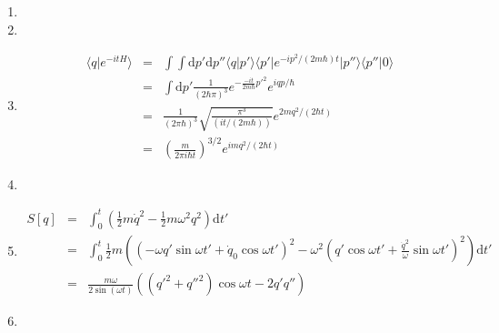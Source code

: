 \documentclass[12pt,a4paper]{article}
\begin{document}
\begin{enumerate}
\item




\item






\item
\begin{eqnarray*}
	\langle q \vert e^{-itH} \rangle &=& \int\int \mathrm dp' \mathrm dp'' \langle q\vert p' \rangle \langle p'  \vert e^{-i p^2/(2m\hbar) t} \vert p''\rangle \langle p'' \vert 0 \rangle \\
	&=& \int \mathrm dp' \frac{1}{(2\hbar \pi)^3} e^{-\frac{-it}{2m\hbar} p'^2} e^{iqp/\hbar} \\
	&=& \frac{1}{(2\pi \hbar)^3} \sqrt{\frac{\pi^3}{(it/(2 m\hbar))}} e^{2mq^2/(2\hbar t)} \\
	&=& \left( \frac{m}{2\pi i\hbar t} \right)^{3/2} e^{imq^2/(2\hbar t)}
\end{eqnarray*}



\item







\item

\begin{eqnarray*}
	S[q] &=& \int_0^t \left( \frac 12 m\dot q^2 - \frac 1 2 m \omega^2  q^2 \right)\mathrm dt' \\
	&=& \int_0^t \frac 1 2 m\left( (-\omega q' \sin\omega t' + \dot q_0 \cos\omega t')^2 -  \omega^2 (q' \cos\omega t' + \frac{\dot q^2}{\omega} \sin\omega t')^2 \right)\mathrm d t'\\
	&=& \frac{m\omega}{2\sin(\omega t)} \left( (q'^2 + q''^2)\cos\omega t - 2q'q'' \right)
\end{eqnarray*}







\item


\end{enumerate}
\end{document}
